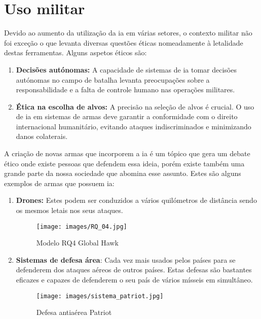 \documentclass[a4paper, 11pt, onecolumn, oneside]{report}
\begin{document}
\section{Uso militar}
Devido ao aumento da utilização da \ac{ia} em várias setores, o contexto militar não foi exceção o que levanta diversas questões éticas nomeadamente à letalidade destas ferramentas. Alguns aspetos éticos são: 
\begin{enumerate}
    \item \textbf{Decisões autónomas:} A capacidade de sistemas de \ac{ia} tomar decisões autónomas no campo de batalha levanta preocupações sobre a responsabilidade e a falta de controle humano nas operações militares.
    \item \textbf{Ética na escolha de alvos:} A precisão na seleção de alvos é crucial. O uso de \ac{ia} em sistemas de armas deve garantir a conformidade com o direito internacional humanitário, evitando ataques indiscriminados e minimizando danos colaterais.
\end{enumerate}
\newpage
\par
A criação de novas armas que incorporem a \ac{ia} é um tópico que gera um debate ético onde existe pessoas que defendem essa ideia, porém existe também uma grande parte da nossa sociedade que abomina esse assunto. Estes são alguns exemplos de armas que possuem \ac{ia}:
\par
\begin{enumerate}
    \item \textbf{Drones:} Estes podem ser conduzidos a vários quilómetros de distância sendo os mesmos letais nos seus ataques.
    \begin{figure}[ht]
    \centering
    \texttt{[image: images/RQ\_04.jpg]}
    \caption{Modelo RQ4 Global Hawk\cite{i44}}
    \label{RQ_04}
    \end{figure}
    \item \textbf{Sistemas de defesa área}: Cada vez mais usados pelos países para se defenderem dos ataques aéreos de outros países. Estas defesas são bastantes eficazes e capazes de defenderem o seu país de vários mísseis em simultâneo.
    \begin{figure}[ht]
    \centering
    \texttt{[image: images/sistema\_patriot.jpg]}
    \caption{Defesa antiaérea Patriot\cite{i45}}
    \label{sistema_patriot}
    \end{figure}
\end{enumerate}
%
\end{document}
